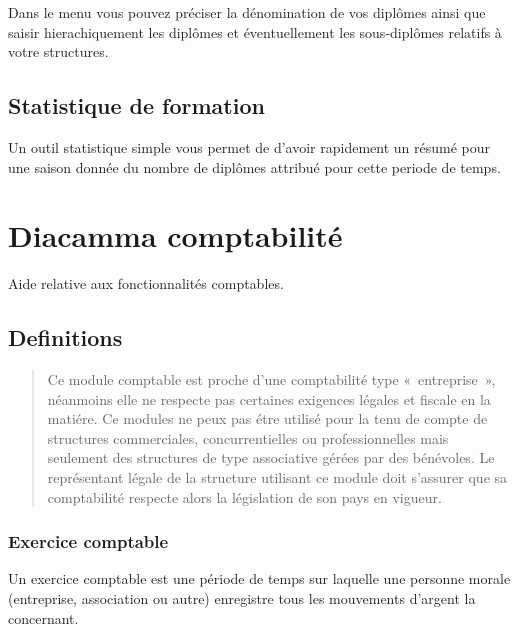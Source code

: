 \documentclass[a4paper,10pt,oneside,french]{sphinxmanual}
\begin{document}
Dans le menu  vous pouvez préciser la dénomination de vos diplômes
ainsi que saisir hierachiquement les diplômes et éventuellement les sous-diplômes relatifs à votre structures.


\section{Statistique de formation}
\label{\detokenize{event/statistic::doc}}\label{\detokenize{event/statistic:statistique-de-formation}}
Un outil statistique simple vous permet de d’avoir rapidement un résumé pour une saison donnée du nombre de diplômes attribué pour cette periode de temps.


\chapter{Diacamma comptabilité}
\label{\detokenize{accounting/index::doc}}\label{\detokenize{accounting/index:diacamma-comptabilite}}
Aide relative aux fonctionnalités comptables.


\section{Definitions}
\label{\detokenize{accounting/definition::doc}}\label{\detokenize{accounting/definition:definitions}}\begin{quote}

 Ce module comptable est proche d’une comptabilité type « entreprise », néanmoins elle ne respecte pas certaines exigences légales et fiscale en la matiére.
Ce modules ne peux pas étre utilisé pour la tenu de compte de structures commerciales, concurrentielles ou professionnelles mais seulement des structures de type associative gérées par des bénévoles.
Le représentant légale de la structure utilisant ce module doit s’assurer que sa comptabilité respecte alors la législation de son pays en vigueur.
\end{quote}


\subsection{Exercice comptable}
\label{\detokenize{accounting/definition:exercice-comptable}}
Un exercice comptable est une période de temps sur laquelle une
personne morale (entreprise, association ou autre) enregistre tous les
mouvements d’argent la concernant.
\end{document}
